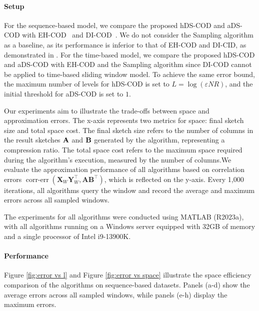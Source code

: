 \paragraph{Setup} For the sequence-based model, we compare the proposed hDS-COD and  aDS-COD with EH-COD~\cite{yao2024approximate} and DI-COD~\cite{yao2024approximate}. We do not consider the Sampling algorithm as a baseline, as its performance is inferior to that of EH-COD and DI-CID, as demonstrated in \cite{yao2024approximate}. %
For the time-based model, we compare the proposed hDS-COD and  aDS-COD with EH-COD and the Sampling algorithm since DI-COD cannot be applied to time-based sliding window model. To achieve the same error bound, the maximum number of levels for hDS-COD is set to $L = \log{(\varepsilon NR)}$, and the initial threshold for aDS-COD is set to $1$.

Our experiments aim to illustrate the trade-offs between space and approximation errors. The x-axis represents two metrics for space: final sketch size and total space cost. The final sketch size refers to the number of columns in the result sketches ${\bf A}$ and ${\bf B}$ generated by the algorithm, representing a compression ratio. The total space cost refers to the maximum space required during the algorithm's execution, measured by the number of columns.We evaluate the approximation performance of all algorithms based on correlation errors $\operatorname{corr-err}(\mathbf{X}_W \mathbf{Y}_W^\top, \mathbf{A} \mathbf{B}^\top)$, which is reflected on the y-axis. Every 1,000 iterations, all algorithms query the window and record the average and maximum errors across all sampled windows.

The experiments for all algorithms were conducted using MATLAB (R2023a), with all algorithms running on a Windows server equipped with 32GB of memory and a single processor of Intel i9-13900K.

\paragraph{Performance} Figure \ref{fig:error vs l} and Figure \ref{fig:error vs space} illustrate the space efficiency comparison of the algorithms on sequence-based datasets. Panels (a-d) show the average errors across all sampled windows, while panels (e-h) display the maximum errors.

